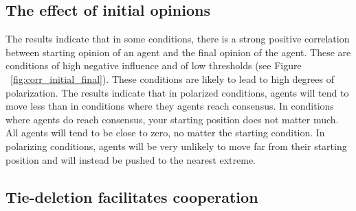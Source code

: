 \documentclass{article}
\begin{document}
\subsection{The effect of initial opinions}

The results indicate that in some conditions, there is a strong positive correlation between starting opinion of an agent and the final opinion of the agent. 
These are conditions of high negative influence and of low thresholds (see Figure ~\ref{fig:corr_initial_final}). These conditions are likely to lead to high degrees of polarization. The results indicate that in polarized conditions, agents will tend to move less than in conditions where they agents reach consensus. In conditions where agents do reach consensus, your starting position does not matter much. All agents will tend to be close to zero, no matter the starting condition. In polarizing conditions, agents will be very unlikely to move far from their starting position and will instead be pushed to the nearest extreme. 

\subsection{Tie-deletion facilitates cooperation}
\end{document}
